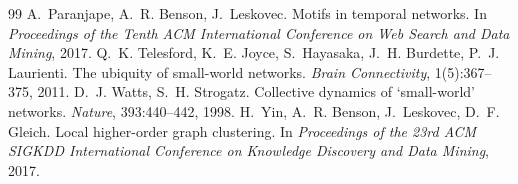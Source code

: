 \documentclass[12pt, a4paper]{article}
\begin{document}
\begin{thebibliography}{99}
 A.~Paranjape, A.~R. Benson, J.~Leskovec. Motifs in
  temporal networks. In \emph{Proceedings of the Tenth ACM International
  Conference on Web Search and Data Mining}, 2017.
 Q.~K. Telesford, K.~E. Joyce, S.~Hayasaka,
  J.~H. Burdette, P.~J. Laurienti. The ubiquity of small-world networks.
  \emph{Brain Connectivity}, 1(5):367--375, 2011.
 D.~J. Watts, S.~H. Strogatz. Collective dynamics of
  `small-world' networks. \emph{Nature}, 393:440--442, 1998.
 H.~Yin, A.~R. Benson, J.~Leskovec, D.~F. Gleich. Local
  higher-order graph clustering. In \emph{Proceedings of the 23rd ACM SIGKDD
  International Conference on Knowledge Discovery and Data Mining}, 2017.
\end{thebibliography}
\end{document}
